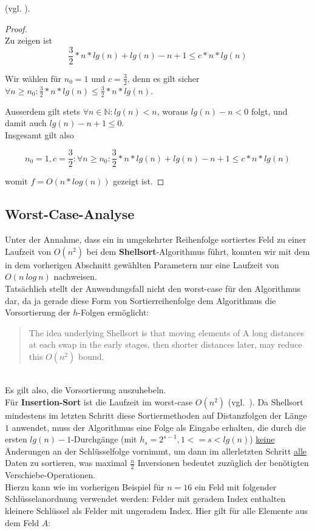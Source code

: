 {(vgl. \cite[11]{GD18a}).

\begin{proof}\label{pr:nlogn}
    \\
Zu zeigen ist
\begin{equation}
\frac{3}{2} * n * lg(n) + lg(n) - n + 1 \leq c * n * lg(n)
\end{equation}

Wir wählen für $n_0 = 1$  und $c = \frac{3}{2}$, denn es gilt sicher $\forall n \geq n_0: \frac{3}{2} * n * lg(n)  \leq \frac{3}{2} * n * lg(n)$.

Ausserdem gilt stets $\forall n \in \mathbb{N}: lg(n) < n$, woraus $lg(n) - n < 0$ folgt, und damit auch $lg(n) - n + 1 \leq 0$.
\\
Insgesamt gilt also

\begin{equation}
n_0 = 1, c = \frac{3}{2}: \forall n \geq n_0: \frac{3}{2} * n * lg(n) + lg(n) - n + 1 \leq c * n * lg(n)
\end{equation}

    womit $f = O(n * log(n))$ gezeigt ist.\square
\end{proof}

\subsection*{Worst-Case-Analyse}

Unter der Annahme, dass ein in umgekehrter Reihenfolge sortiertes Feld zu einer Laufzeit von $O(n^2)$ bei dem \textbf{Shellsort}-Algorithmus führt, konnten wir mit dem in dem vorherigen Abschnitt gewählten Parametern nur eine Laufzeit von $O(n\ log\ n)$ nachweisen.
\\

Tatsächlich stellt der Anwendungsfall nicht den worst-case für den Algorithmus dar, da ja gerade diese Form von Sortierreihenfolge dem Algorithmus die Vorsortierung der $h$-Folgen ermöglicht:
\\
\blockquote[{\cite[3]{Pra72}}]{
    The idea underlying Shellsort is that moving elements of A long
    distances at each swap in the early stages, then shorter distances later,
    may reduce this $O(n^2)$ bound.
}
\\

Es gilt also, die Vorsortierung auszuhebeln.
\\

Für \textbf{Insertion-Sort} ist die Laufzeit im worst-case $O(n^2)$ (vgl.~\cite[87]{OW17b}). Da Shellsort mindestens im letzten Schritt diese Sortiermethoden auf Distanzfolgen der Länge $1$ anwendet, muss der Algorithmus eine Folge als Eingabe erhalten, die durch die ersten $lg(n) - 1$-Durchgänge (mit $h_s = 2^{s - 1}, 1 <= s < lg(n)$) \underline{keine} Änderungen an der Schlüsselfolge vornimmt, um dann im allerletzten Schritt \underline{alle} Daten zu sortieren, was maximal $\frac{n}{2}$ Inversionen bedeutet zuzüglich der benötigten Verschiebe-Operationen.
\\
Hierzu kann wie im vorherigen Beispiel für $n=16$ ein Feld mit folgender Schlüsselanordnung verwendet werden: Felder mit geradem Index enthalten kleinere Schlüssel als Felder mit ungeradem Index.
Hier gilt für alle Elemente aus dem Feld $A$:

}
